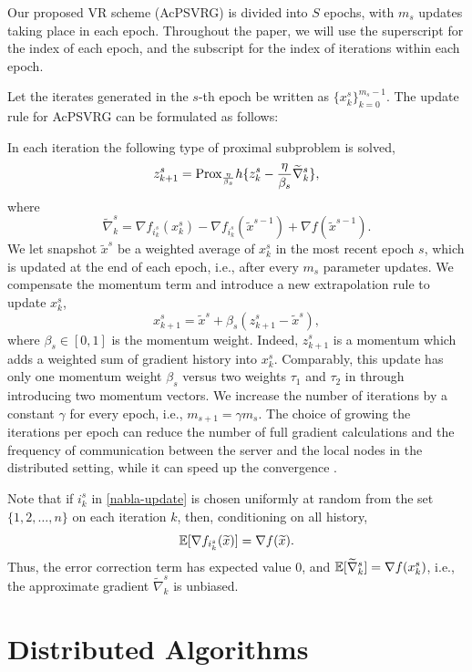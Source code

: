 Our proposed VR scheme (AcPSVRG) is divided into $S$ epochs, with $m_s$ updates taking place in each epoch.  Throughout the paper, we will
use the superscript for the index of each epoch, and the subscript for the index of iterations within each epoch.

Let the iterates generated in the $s$-th epoch be written as $\{x_k^s\}_{k=0}^{m_s-1}$. The update rule for AcPSVRG can be formulated as follows: 

In each iteration the following type of proximal subproblem is solved,
\begin{equation}
z_{k+1}^s = \text{Prox}_{\frac{\eta}{\beta_s}} h \{z_{k}^s - \frac{\eta}{\beta_s}\widetilde{\nabla}_k^s\},
\end{equation}
where
\begin{equation}\label{nabla-update}
\widetilde{\nabla}_k^s = \nabla f_{i_k^s}(x_k^s) - \nabla f_{i_k^s}(\widetilde{x}^{s-1}) + \nabla f(\widetilde{x}^{s-1}).
\end{equation}
We let snapshot $\widetilde{x}^s$ be a weighted average of $x_k^{s}$ in the most recent epoch $s$, which is updated at the end of each epoch, i.e., after every $m_s$ parameter updates. We compensate the momentum term and introduce a new extrapolation rule to update $x_k^{s}$,
\[
x_{k+1}^s = \widetilde{x}^s+\beta_s(z_{k+1}^s-\widetilde{x}^s),
\]
where $\beta_s \in [0, 1]$ is the momentum weight. Indeed, $z_{k+1}^s$ is a momentum which adds a weighted sum of gradient history into $x_k^{s}$. Comparably, this update has only one momentum weight $\beta_s$ versus two weights $\tau_1$ and $\tau_2$ in \cite{Allen-Zhu17} through introducing two momentum vectors.  
We increase the number of
iterations by a constant $\gamma$ for every epoch, i.e., $m_{s+1} = \gamma m_{s}$.
The choice of growing the iterations per epoch can reduce the number of full gradient calculations and the frequency of communication between
the server and the local nodes in the distributed setting, while it can speed up the convergence \cite{Allen-Zhu2016I}.

Note that if $i_k^s$ in \eqref{nabla-update} is chosen uniformly at random from the set $\{1,2,\ldots,n\}$ on each iteration $k$, then, conditioning on all history,
\[
\mathbb{E}[\nabla f_{i_k^s}(\widetilde{x})] = \nabla f(\widetilde{x}).
\] 
Thus, the error correction term has expected value $0$, and $\mathbb{E}[\widetilde{\nabla}_k^s] = \nabla f(x_{k}^s)$, i.e., the approximate gradient $\widetilde{\nabla}_k^s$ is unbiased.

\section{Distributed Algorithms}

